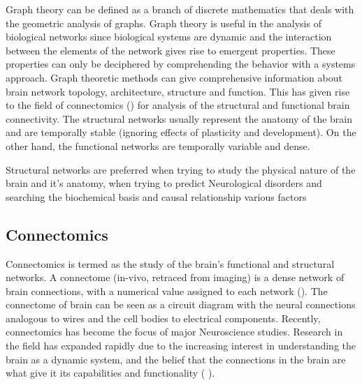 \documentclass[msthesis.tex]{subfiles}
\begin{document}
Graph theory can be defined as a branch of discrete mathematics that deals with the geometric analysis of graphs. Graph theory is useful in the analysis of biological networks since biological systems are dynamic and the interaction between the elements of the network gives rise to emergent properties. These properties can only be deciphered by comprehending the behavior with a systems approach. Graph theoretic methods can give comprehensive information about brain network topology, architecture, structure and function. This has given rise to the field of connectomics (\citep{sporns2005human}) for analysis of the structural and functional brain connectivity. The structural networks usually represent the anatomy of the brain and are temporally stable (ignoring effects of plasticity and development). On the other hand, the functional networks are temporally variable and dense.

Structural networks are preferred when trying to study the physical nature of the brain and it's anatomy, when trying to predict Neurological disorders and searching the biochemical basis and causal relationship various factors

\subsection{Connectomics}
\label{sec:connectomics}
Connectomics is termed as the study of the brain's functional and structural networks. A connectome (in-vivo, retraced from imaging) is a dense network of brain connections, with a numerical value assigned to each network (\cite{bassett2017network}). The connectome of brain can be seen as a circuit diagram with the neural connections analogous to wires and the cell bodies to electrical components.
Recently, connectomics has become the focus of major Neuroscience studies. Research in the field has expanded rapidly due to the increasing interest in understanding the brain as a dynamic system, and the belief that the connections in the brain are what give it its capabilities and functionality ( \cite{network_neuroscience_editorial}).
\end{document}
